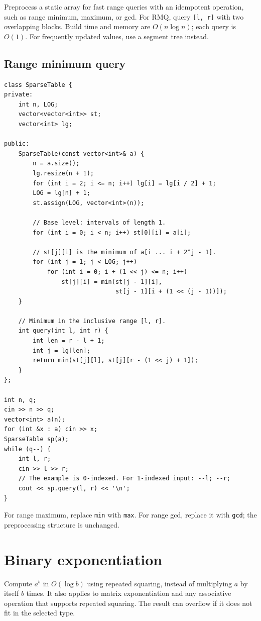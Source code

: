 Preprocess a static array for fast range queries with an idempotent operation, such as range minimum, maximum, or gcd. For RMQ, query \texttt{[l, r]} with two overlapping blocks. Build time and memory are $O(n \log n)$; each query is $O(1)$. For frequently updated values, use a segment tree instead.

\subsection{Range minimum query}
\begin{lstlisting}
class SparseTable {
private:
    int n, LOG;
    vector<vector<int>> st;
    vector<int> lg;

public:
    SparseTable(const vector<int>& a) {
        n = a.size();
        lg.resize(n + 1);
        for (int i = 2; i <= n; i++) lg[i] = lg[i / 2] + 1;
        LOG = lg[n] + 1;
        st.assign(LOG, vector<int>(n));

        // Base level: intervals of length 1.
        for (int i = 0; i < n; i++) st[0][i] = a[i];

        // st[j][i] is the minimum of a[i ... i + 2^j - 1].
        for (int j = 1; j < LOG; j++)
            for (int i = 0; i + (1 << j) <= n; i++)
                st[j][i] = min(st[j - 1][i],
                               st[j - 1][i + (1 << (j - 1))]);
    }

    // Minimum in the inclusive range [l, r].
    int query(int l, int r) {
        int len = r - l + 1;
        int j = lg[len];
        return min(st[j][l], st[j][r - (1 << j) + 1]);
    }
};

int n, q;
cin >> n >> q;
vector<int> a(n);
for (int &x : a) cin >> x;
SparseTable sp(a);
while (q--) {
    int l, r;
    cin >> l >> r;
    // The example is 0-indexed. For 1-indexed input: --l; --r;
    cout << sp.query(l, r) << '\n';
}
\end{lstlisting}

For range maximum, replace \texttt{min} with \texttt{max}. For range gcd, replace it with \texttt{gcd}; the preprocessing structure is unchanged.

\section{Binary exponentiation}

Compute $a^b$ in $O(\log b)$ using repeated squaring, instead of multiplying $a$ by itself $b$ times. It also applies to matrix exponentiation and any associative operation that supports repeated squaring. The result can overflow if it does not fit in the selected type.

